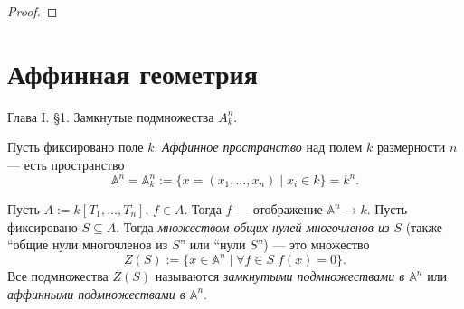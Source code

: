 \documentclass[12pt,a4paper]{article}
\newcommand{\Ker}{\mathrm{Ker}}
\renewcommand{\AA}{\ensuremath{\mathbb{A}}\xspace}
\begin{document}
\begin{proof}


    \end{proof}

    \section{Аффинная геометрия}
    
    \begin{remark*}
        Глава I. \S 1. Замкнутые подмножества $A_k^n$.
    \end{remark*}

    \begin{definition}
        Пусть фиксировано поле $k$. \emph{Аффинное пространство} над полем $k$ размерности $n$ --- есть пространство
        \[\AA^n = \AA_k^n := \{x = (x_1, \dots, x_n) \mid x_i \in k\} = k^n.\]

        Пусть $A := k[T_1, \dots, T_n]$, $f \in A$. Тогда $f$ --- отображение $\AA^n \to k$. Пусть фиксировано $S \subseteq A$. Тогда \emph{множеством общих нулей многочленов из $S$} (также ``общие нули многочленов из $S$'' или ``нули $S$'') --- это множество
        \[Z(S) := \{x \in \AA^n \mid \forall f \in S\; f(x) = 0\}.\]
        Все подмножества $Z(S)$ называются \emph{замкнутыми подмножествами в $\AA^n$} или \emph{аффинными подмножествами в $\AA^n$}.
    \end{definition}
\end{document}
